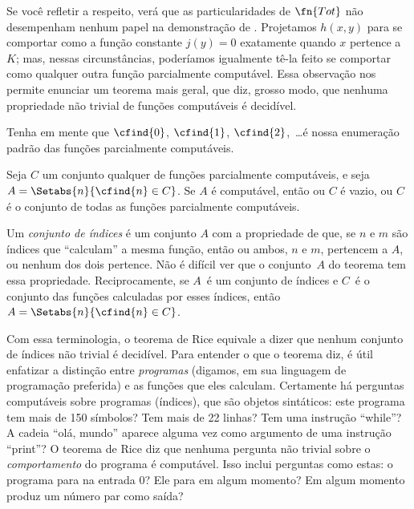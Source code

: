 \documentclass[../../../include/open-logic-section]{subfiles}
\begin{document}

Se você refletir a respeito, verá que as particularidades de
$\fn{Tot}$ não desempenham nenhum papel na demonstração de
. Projetamos $h(x,y)$ para se comportar como a
função constante $j(y) = 0$ exatamente quando $x$ pertence a $K$; mas,
nessas circunstâncias, poderíamos igualmente tê-la feito se comportar
como qualquer outra função parcialmente computável. Essa observação
nos permite enunciar um teorema mais geral, que diz, grosso modo, que
nenhuma propriedade não trivial de funções computáveis é decidível.

Tenha em mente que $\cfind{0}$, $\cfind{1}$, $\cfind{2}$,~\dots é
nossa enumeração padrão das funções parcialmente computáveis.

\begin{thm}
  Seja $C$ um conjunto qualquer de funções parcialmente computáveis, e
  seja $A = \Setabs{n}{\cfind{n} \in C}$. Se $A$ é computável, então
  ou $C$ é vazio, ou $C$ é o conjunto de todas as funções parcialmente
  computáveis.
\end{thm}

Um {\em conjunto de índices} é um conjunto $A$ com a propriedade de
que, se $n$ e $m$ são índices que ``calculam'' a mesma função, então
ou ambos, $n$ e $m$, pertencem a $A$, ou nenhum dos dois pertence.
Não é difícil ver que o conjunto~$A$ do teorema tem essa propriedade.
Reciprocamente, se $A$~é um conjunto de índices e $C$~é o conjunto das
funções calculadas por esses índices, então
$A = \Setabs{n}{\cfind{n} \in C}$.

\begin{explain}
Com essa terminologia, o teorema de Rice equivale a dizer que nenhum
conjunto de índices não trivial é decidível. Para entender o que o
teorema diz, é útil enfatizar a distinção entre \emph{programas}
(digamos, em sua linguagem de programação preferida) e as funções que
eles calculam. Certamente há perguntas computáveis sobre programas
(índices), que são objetos sintáticos: este programa tem mais de 150
símbolos? Tem mais de 22 linhas? Tem uma instrução ``while''? A cadeia
``olá, mundo'' aparece alguma vez como argumento de uma instrução
``print''? O teorema de Rice diz que nenhuma pergunta não trivial
sobre o \emph{comportamento} do programa é computável. Isso inclui
perguntas como estas: o programa para na entrada $0$? Ele para em
algum momento? Em algum momento produz um número par como saída?
\end{explain}
\end{document}
